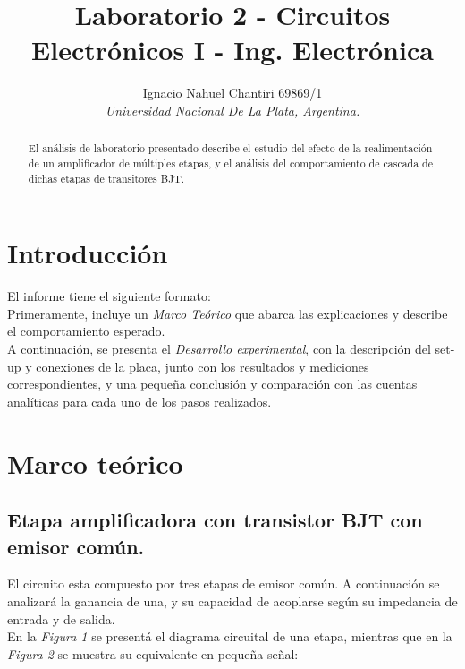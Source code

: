 \documentclass[letterpaper, 10 pt, conference]{ieeeconf}  %
\title{\LARGE \bf
Laboratorio 2 - Circuitos Electrónicos I - Ing. Electrónica
}
\author{Ignacio Nahuel Chantiri 69869/1 \\  %
{\it Universidad Nacional De La Plata, Argentina.}}                              %
\begin{document}
\maketitle
\thispagestyle{empty}
\pagestyle{empty}


\begin{abstract}

El análisis de laboratorio presentado describe el estudio del efecto de la realimentación de un amplificador de múltiples etapas, y el análisis del comportamiento de cascada de dichas etapas de transitores BJT.\\
\end{abstract}


\section{Introducci\'on}

El informe tiene el siguiente formato:\\
Primeramente, incluye un \textit{Marco Teórico} que abarca las explicaciones y describe el comportamiento esperado.\\ A continuación, se presenta el \textit{Desarrollo experimental}, con la descripción del set-up y conexiones de la placa, junto con los resultados y mediciones correspondientes, y una pequeña conclusión y comparación con las cuentas analíticas para cada uno de los pasos realizados.


\section{Marco teórico}



\subsection{\textbf{Etapa amplificadora con transistor BJT con emisor común.}}

El circuito esta compuesto por tres etapas de emisor común. A continuación se analizará la ganancia de una, y su capacidad de acoplarse según su impedancia de entrada y de salida.\\
En la \textit{Figura 1} se presentá el diagrama circuital de una etapa, mientras que en la \textit{Figura 2} se muestra su equivalente en pequeña señal:
\end{document}
